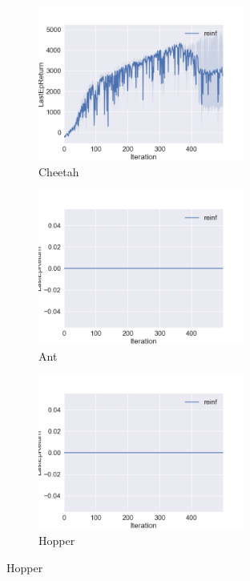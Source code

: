 \documentclass[10pt]{article}
\begin{document}
\begin{figure}[ht!]
    \centering
    \begin{subfigure}[h]{0.6\linewidth}
        \centering
        \includegraphics[height=2in]{figures/sac_cheetah.png}
        \caption{Cheetah}
    \end{subfigure}
    \vskip 0.3in
    \begin{subfigure}[h]{0.6\textwidth}
        \centering
        \includegraphics[height=2in]{figures/ph_sac.png}
        \caption{Ant}
    \end{subfigure}
    \vskip 0.3in
    \begin{subfigure}[h]{0.6\textwidth}
        \centering
        \includegraphics[height=2in]{figures/ph_sac.png}
        \caption{Hopper}
    \end{subfigure}
\end{figure}
\end{document}
